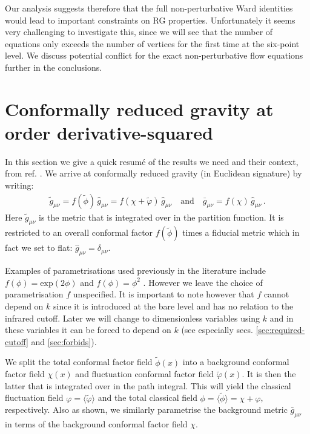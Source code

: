 \documentclass[11pt]{book} %
\newcommand{\vp}{\varphi}
\numberwithin{equation}{chapter}
\begin{document}
Our analysis suggests therefore that the full non-perturbative Ward identities would lead
to important constraints on RG properties. Unfortunately it seems very challenging to investigate this,
since we will see that the number of equations only exceeds the number of vertices for the first time
at the six-point level.
We discuss potential conflict for the exact non-perturbative flow equations further in the conclusions.


\section{Conformally reduced gravity at order derivative-squared}
\label{sec:review}

In this section we give a quick resum\'e of the results we need and their context,
from ref. \cite{Dietz:2015owa}.
We arrive at conformally reduced gravity (in Euclidean signature) by writing:
\begin{align}
  \tilde g_{\mu\nu} = f(\tilde\phi) \, \hat g_{\mu\nu}
                    = f(\chi +\tilde\varphi ) \, \hat g_{\mu\nu}
  \quad \text{and} \quad
  \bar g_{\mu\nu} = f(\chi) \, \hat g_{\mu\nu} \,.
  \label{conformal-reduction}
\end{align}
Here $\tilde g_{\mu\nu}$ is the metric that is integrated over in the partition function.
It is restricted to an overall conformal factor $f(\tilde\phi)$ times a fiducial metric which
in fact we set to flat: $\hat g_{\mu\nu}=\delta_{\mu\nu}$.

Examples of parametrisations used previously in the literature include
$f(\phi) = \mathrm{exp}(2\phi)$ \cite{Machado:2009ph} and
$f(\phi) = \phi^2$ \cite{Manrique:2009uh, Bonanno:2012dg}.
However we leave the choice of parametrisation $f$ unspecified.
It is important to note however that $f$ cannot depend on $k$ since it is introduced at the bare level
and has no relation to the infrared cutoff.
Later we will change to dimensionless variables using $k$ and in these variables it can be forced
to depend on $k$ (see especially secs. \ref{sec:required-cutoff} and \ref{sec:forbids}).

We split the total conformal factor field $\tilde\phi(x)$ into a background conformal factor
field $\chi(x)$ and fluctuation conformal factor field $\tilde\vp(x)$.
It is then the latter that is integrated over in the path integral.
This will yield the classical fluctuation field $\vp = \langle \tilde \vp \rangle$ and the total classical
field $\phi = \langle \tilde \phi \rangle = \chi + \vp$, respectively.
Also as shown, we similarly parametrise the background
metric $\bar{g}_{\mu\nu}$ in terms of the background conformal factor field $\chi$.
\end{document}

